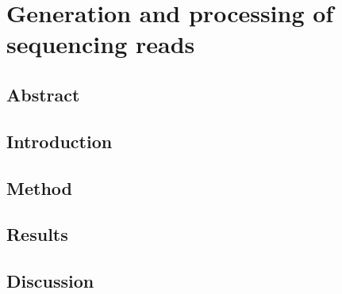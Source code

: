 \section{Generation and processing of sequencing reads}

    \subsection{Abstract}

        \noindent

    \subsection{Introduction}

        \noindent

    \subsection{Method}

        \noindent

    \subsection{Results}

        \noindent

    \subsection{Discussion}

        \noindent
